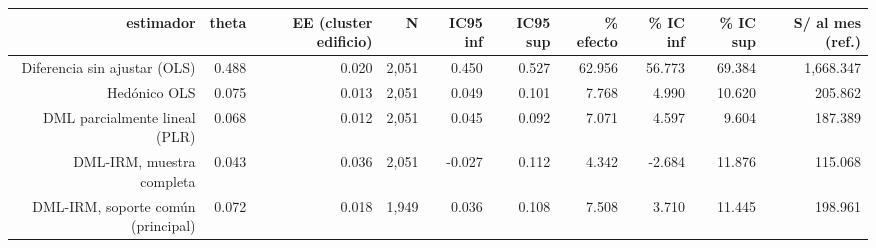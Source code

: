 \begin{tabular}{rrrrrrrrrr}
\toprule
estimador & theta & EE (cluster edificio) & N & IC95 inf & IC95 sup & \% efecto & \% IC inf & \% IC sup & S/ al mes (ref.) \\
\midrule
Diferencia sin ajustar (OLS) & 0.488 & 0.020 & 2,051 & 0.450 & 0.527 & 62.956 & 56.773 & 69.384 & 1,668.347 \\
Hedónico OLS & 0.075 & 0.013 & 2,051 & 0.049 & 0.101 & 7.768 & 4.990 & 10.620 & 205.862 \\
DML parcialmente lineal (PLR) & 0.068 & 0.012 & 2,051 & 0.045 & 0.092 & 7.071 & 4.597 & 9.604 & 187.389 \\
DML-IRM, muestra completa & 0.043 & 0.036 & 2,051 & -0.027 & 0.112 & 4.342 & -2.684 & 11.876 & 115.068 \\
DML-IRM, soporte común (principal) & 0.072 & 0.018 & 1,949 & 0.036 & 0.108 & 7.508 & 3.710 & 11.445 & 198.961 \\
\bottomrule
\end{tabular}